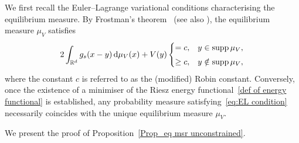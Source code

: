 \documentclass{amsart}
\def\R{\mathbb{R}}
\newcommand{\ud}{\, \mathrm{d}}
\theoremstyle{plain}
\theoremstyle{remark}
\numberwithin{equation}{section}
\begin{document}
We first recall the Euler--Lagrange variational conditions characterising the equilibrium measure. By Frostman's theorem~\cite{Fr35} (see also \cite[Theorem~2]{DOSW23}), the equilibrium measure $\mu_V$ satisfies 
\begin{equation}
\label{eq:EL condition}
    2\int_{\R^d} g_s(x-y) \ud \mu_V(x) +V(y) \begin{cases}
        = c, & y \in \operatorname{supp} \mu_V,
        \smallskip 
        \\
        \ge c, &y \notin \operatorname{supp}\mu_V,
    \end{cases}
\end{equation}
where the constant $c$ is referred to as the (modified) Robin constant. Conversely, once the existence of a minimiser of the Riesz energy functional~\eqref{def of energy functional} is established, any probability measure satisfying~\eqref{eq:EL condition} necessarily coincides with the unique equilibrium measure $\mu_V$. 

We present the proof of Proposition~\ref{Prop_eq msr unconstrained}. 
 
\end{document}
